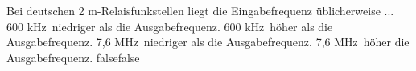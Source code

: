     {Bei deutschen 2 m-Relaisfunkstellen liegt die Eingabefrequenz üblicherweise ...}
    {600 kHz niedriger als die Ausgabefrequenz.}
    {600 kHz höher als die Ausgabefrequenz.}
    {7,6 MHz niedriger als die Ausgabefrequenz.}
    {7,6 MHz höher die Ausgabefrequenz.}
    {false}{false}